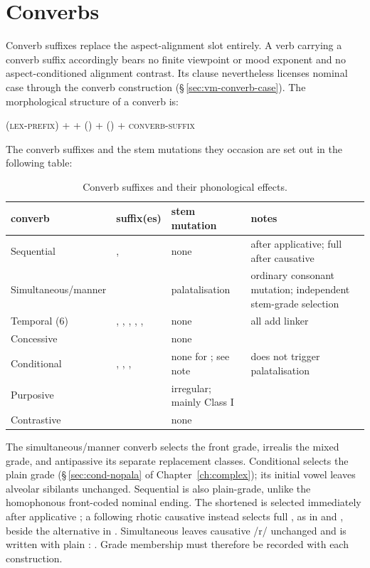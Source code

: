\section{Converbs}\label{sec:converb-morphology}


Converb suffixes replace the aspect-alignment slot entirely. A verb carrying a
converb suffix accordingly bears no finite viewpoint or mood exponent and
no aspect-conditioned alignment contrast. Its clause nevertheless licenses
nominal case through the converb construction (§\,\ref{sec:vm-converb-case}). The
morphological structure of a converb is:

\medskip
\begin{center}
(\textsc{lex-prefix}) + \Stem{} + (\Appl{}) + (\Caus{}) + \textsc{converb-suffix}
\end{center}
\medskip

The converb suffixes and the stem mutations they occasion are set out in the following table:

\begin{table}[ht]
	\footnotesize
	\caption{Converb suffixes and their phonological effects.}\label{tab:converb-morph}
	\begin{tabularx}{\textwidth}{L L L L}
		\toprule
		{\sc converb} & {\sc suffix(es)} & {\sc stem mutation} & {\sc notes} \\
		\midrule
		Sequential    & ,  & none &  after applicative; full  after causative \\
		Simultaneous/manner &  & palatalisation & ordinary consonant mutation; independent stem-grade selection \\
		Temporal (6)  & , , , , ,  & none & all add  linker \\
		Concessive    &  & none & \\
		Conditional   & , , ,  & none for ; see note &  does not trigger palatalisation \\
		Purposive     &  & irregular; mainly Class I & \\
		Contrastive   &  & none & \\
		\bottomrule
	\end{tabularx}
\end{table}

The simultaneous/manner converb  selects the front grade,
irrealis  the mixed grade, and antipassive  its separate
replacement classes. Conditional  selects the plain grade
(§\,\ref{sec:cond-nopala} of Chapter~\ref{ch:complex}); its initial vowel
leaves alveolar sibilants unchanged. Sequential  is also
plain-grade, unlike the homophonous front-coded nominal ending. The shortened
 is selected immediately after applicative ; a following
rhotic causative instead selects full , as in 
and , beside the alternative in . Simultaneous
 leaves causative /r/ unchanged and is written with plain
: .
Grade membership must therefore be recorded with each construction.


